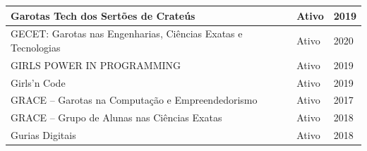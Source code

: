 \begin{longtable}{|l|l|l|}
Garotas Tech dos Sertões de Crateús                                                                                                                         & Ativo                        & 2019                        \\ \hline
  
GECET: Garotas nas Engenharias, Ciências Exatas e Tecnologias                                                                                               & Ativo                        & 2020                        \\ \hline
  
GIRLS POWER IN PROGRAMMING                                                                                                                                  & Ativo                        & 2019                        \\ \hline
Girls’n Code                                                                                                                                                & Ativo                        & 2019                        \\ \hline
GRACE – Garotas na Computação e Empreendedorismo                                                                                                            & Ativo                        & 2017                        \\ \hline
  
GRACE – Grupo de Alunas nas Ciências Exatas                                                                                                                 & Ativo                        & 2018                        \\ \hline
Gurias Digitais                                                                                                                                             & Ativo                        & 2018                        \\ \hline
  

\end{longtable}
